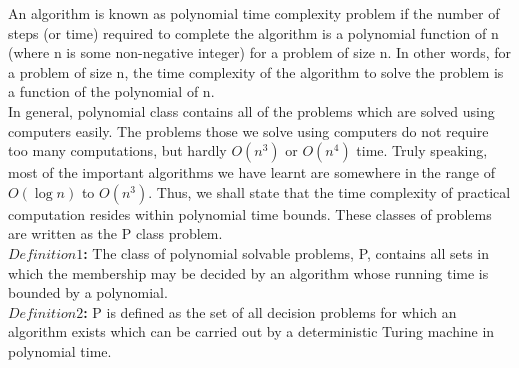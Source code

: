 \documentclass[12pt]{article}
\begin{document}
\vspace*{0.2cm}
\small{
An algorithm is known as polynomial time complexity problem if the number of steps (or time) required
to complete the algorithm is a polynomial function of n (where n is some non-negative integer) for a
problem of size n. In other words, for a problem of size n, the time complexity of the algorithm to solve
the problem is a function of the polynomial of n.\\
\hspace*{0.5cm} In general, polynomial class contains all of the problems which are solved using computers easily.
The problems those we solve using computers do not require too many computations, but hardly
$O(n^{3})$ or $O(n^{4})$ time. Truly speaking, most of the important algorithms we have learnt are somewhere
in the range of $O(\log n)$ to $O(n^{3})$. Thus, we shall state that the time complexity of practical computation
resides within polynomial time bounds. These classes of problems are written as the P class
problem.\\

\vspace*{0.2cm}
\textbf{$Definition1$:} The class of polynomial solvable problems, P, contains all sets in which the membership
may be decided by an algorithm whose running time is bounded by a polynomial.\\

\vspace*{0.2cm}
\textbf{$Definition 2$:} P is defined as the set of all decision problems for which an algorithm exists which can be
carried out by a deterministic Turing machine in polynomial time.\\
}
\end{document}

